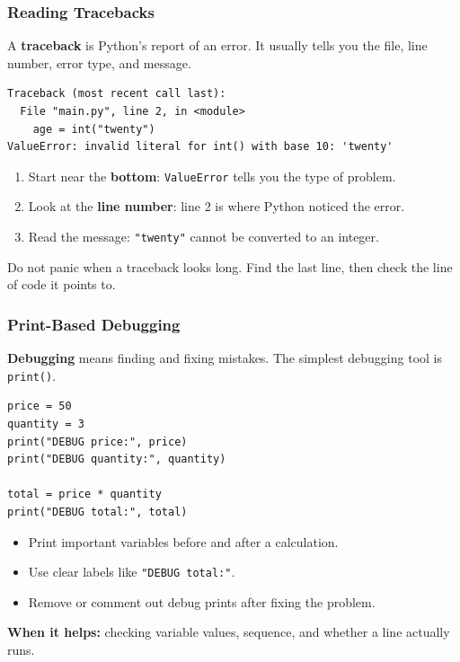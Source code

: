 \documentclass[aspectratio=169,10pt]{beamer}
\newcommand{\keyword}[1]{\textcolor{PrimaryBlue}{\textbf{#1}}}
\newcommand{\myitem}[1]{\item #1\vspace{0.04cm}}
\begin{document}
\begin{frame}[fragile]
\frametitle{Reading Tracebacks}
A \keyword{traceback} is Python's report of an error. It usually tells you the file, line number, error type, and message.

\begin{lstlisting}[style=pycodesmall]
Traceback (most recent call last):
  File "main.py", line 2, in <module>
    age = int("twenty")
ValueError: invalid literal for int() with base 10: 'twenty'
\end{lstlisting}

\begin{tcolorbox}[lecturebox,title=How to read it]
\begin{enumerate}\small\setlength\itemsep{0.04cm}
  \item Start near the \keyword{bottom}: \texttt{ValueError} tells you the type of problem.
  \item Look at the \keyword{line number}: line 2 is where Python noticed the error.
  \item Read the message: \texttt{"twenty"} cannot be converted to an integer.
\end{enumerate}
\end{tcolorbox}

\begin{tcolorbox}[lecturebox,title=Beginner habit]
Do not panic when a traceback looks long. Find the last line, then check the line of code it points to.
\end{tcolorbox}
\end{frame}


\begin{frame}[fragile]
\frametitle{Print-Based Debugging}
\begin{tcolorbox}[lecturebox,title=Key idea]
\keyword{Debugging} means finding and fixing mistakes. The simplest debugging tool is \texttt{print()}.
\end{tcolorbox}

\begin{lstlisting}[style=pycode]
price = 50
quantity = 3
print("DEBUG price:", price)
print("DEBUG quantity:", quantity)

total = price * quantity
print("DEBUG total:", total)
\end{lstlisting}

\begin{itemize}\setlength\itemsep{0.03cm}
  \myitem{Print important variables before and after a calculation.}
  \myitem{Use clear labels like \texttt{"DEBUG total:"}.}
  \myitem{Remove or comment out debug prints after fixing the problem.}
\end{itemize}

\vspace{0.05cm}
{\small \keyword{When it helps:} checking variable values, sequence, and whether a line actually runs.}
\end{frame}
\end{document}
